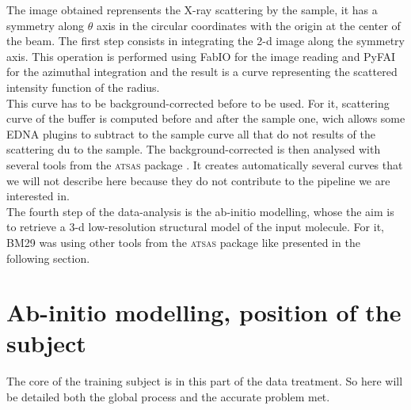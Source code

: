 \documentclass[a4paper, 11pt]{report}
\begin{document}
The image obtained reprensents the X-ray scattering by the sample, it 
has a symmetry along $\theta$ axis in the circular coordinates with the 
origin at the center of the beam. 
The first step consists in integrating the 2-d image along the 
symmetry axis. 
This operation is performed using FabIO \cite{fabio} for the image 
reading and PyFAI \cite{pyFAI} for the azimuthal integration and the 
result is a curve representing the scattered intensity function of the 
radius.\\%

This curve has to be background-corrected before to be used. 
For it, scattering curve of the buffer is computed before and after 
the sample one, wich allows some EDNA plugins to subtract to the 
sample curve all that do not results of the scattering du to the 
sample. 
The background-corrected is then analysed with several tools from the 
\textsc{atsas} package \cite{atsas}. 
It creates automatically several curves that we will not describe here 
because they do not contribute to the pipeline we are interested in.\\

The fourth step of the data-analysis is the ab-initio modelling, whose 
the aim is to retrieve a 3-d low-resolution structural model of the 
input molecule. 
For it, BM29 was using other tools from the \textsc{atsas} package 
like presented in the following section.

\section{Ab-initio modelling, position of the subject}
\label{modelling}                           %

The core of the training subject is in this part of the data 
treatment. 
So here will be detailed both the global process and the accurate 
problem met.\\
\end{document}
